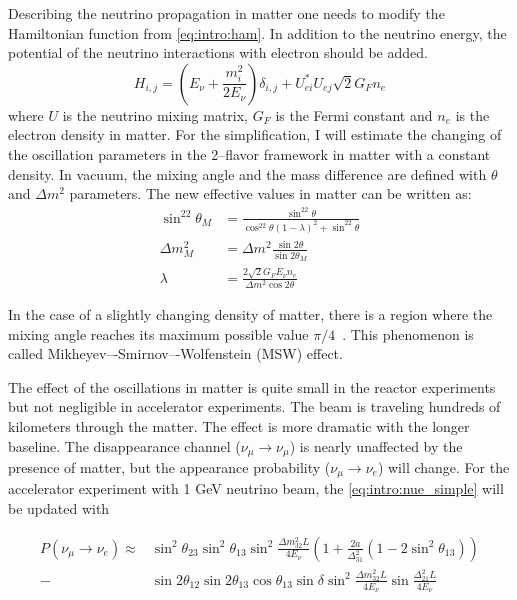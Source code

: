 \documentclass[../main.tex]{subfiles}
\begin{document}
Describing the neutrino propagation in matter one needs to modify the Hamiltonian function from \autoref{eq:intro:ham}. In addition to the neutrino energy, the potential of the neutrino interactions with electron should be added.
\begin{equation}
H_{i,j}=\left(E_\nu+\frac{m_i^2}{2E_\nu}\right)\delta_{i,j}+U_{ei}^*U_{ej}\sqrt2G_Fn_e
\end{equation}
where $U$ is the neutrino mixing matrix, $G_F$ is the Fermi constant and $n_e$ is the electron density in matter. For the simplification, I will estimate the changing of the oscillation parameters in the 2--flavor framework in matter with a constant density. In vacuum, the mixing angle and the mass difference are defined with $\theta$ and $\Delta m^2$ parameters. The new effective values in matter can be written  as:
\begin{align}
\sin^22\theta_M&=\frac{\sin^22\theta}{\cos^22\theta(1-\lambda)^2+\sin^22\theta} \\
\Delta m^2_M&=\Delta m^2\frac{\sin2\theta}{\sin2\theta_M} \\
\lambda&=\frac{2\sqrt2G_FE_\nu n_e}{\Delta m^2\cos2\theta}
\end{align}

In the case of a slightly changing density of matter, there is a region where the mixing angle reaches its maximum possible value $\pi/4$~\cite{Mikheyev1985}. This phenomenon is called Mikheyev–-Smirnov–-Wolfenstein (MSW) effect.

The effect of the oscillations in matter is quite small in the reactor experiments but not negligible in accelerator experiments. The beam is traveling hundreds of kilometers through the matter. The effect is more dramatic with the longer baseline. The disappearance channel ($\nu_\mu\to\nu_\mu$) is nearly unaffected by the presence of matter, but the appearance probability  ($\nu_\mu\to\nu_e$) will change. For the accelerator experiment with 1 GeV neutrino beam, the \autoref{eq:intro:nue_simple} will be updated with

\begin{align}
P\left(\nu_\mu\to\nu_e\right)\approx&\sin^2\theta_{23}\sin^2\theta_{13}\sin^2\frac{\Delta m_{32}^2L}{4E_\nu}\left(1+\frac{2a}{\Delta_{31}^2}\left(1-2\sin^2\theta_{13}\right)\right) \\
-&\sin2\theta_{12}\sin2\theta_{13}\cos\theta_{13}\sin\delta\sin^2\frac{\Delta m_{32}^2L}{4E_\nu}\sin\frac{\Delta_{21}^2L}{4E_\nu}
\end{align}
\end{document}
